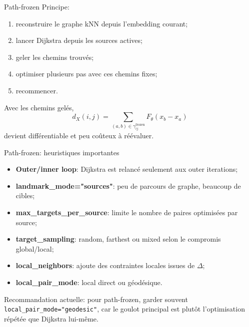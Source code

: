\documentclass[aspectratio=169]{beamer}
\newcommand{\Dtarget}{\Delta}
\newcommand{\Fmetric}{F_\theta}
\begin{document}
\begin{frame}{Path-frozen}
  Principe:
  \begin{enumerate}
    \item reconstruire le graphe kNN depuis l'embedding courant;
    \item lancer Dijkstra depuis les sources actives;
    \item geler les chemins trouvés;
    \item optimiser plusieurs pas avec ces chemins fixes;
    \item recommencer.
  \end{enumerate}

  \vspace{0.2cm}
  Avec les chemins gelés,
  \[
    d_X(i,j)
    =
    \sum_{(a,b)\in \gamma_{ij}^{\mathrm{frozen}}}
    \Fmetric(x_b-x_a)
  \]
  devient différentiable et peu coûteux à réévaluer.
\end{frame}

\begin{frame}{Path-frozen: heuristiques importantes}
  \begin{itemize}
    \item \textbf{Outer/inner loop}: Dijkstra est relancé seulement aux outer iterations;
    \item \textbf{landmark\_mode="sources"}: peu de parcours de graphe, beaucoup de cibles;
    \item \textbf{max\_targets\_per\_source}: limite le nombre de paires optimisées par source;
    \item \textbf{target\_sampling}: random, farthest ou mixed selon le compromis global/local;
    \item \textbf{local\_neighbors}: ajoute des contraintes locales issues de $\Dtarget$;
    \item \textbf{local\_pair\_mode}: local direct ou géodésique.
  \end{itemize}

  \vspace{0.2cm}
  Recommandation actuelle: pour path-frozen, garder souvent
  \texttt{local\_pair\_mode="geodesic"}, car le goulot principal est plutôt
  l'optimisation répétée que Dijkstra lui-même.
\end{frame}
\end{document}

